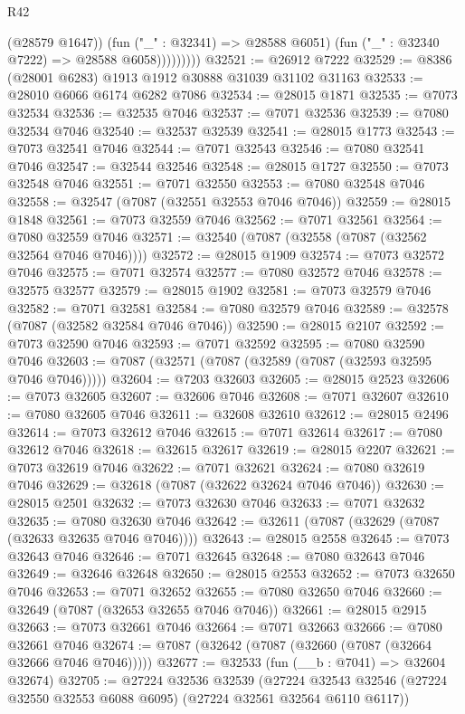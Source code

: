 \begin{lexlean}{R42}
\begin{coremodule}
{                      (@28579 @1647))
                    (fun ("_" : @32341) => @28588 @6051)
                    (fun ("_" : @32340 @7222) => @28588 @6058)))))))))
@32521 := @26912 @7222
@32529 := @8386 (@28001 @6283) @1913 @1912 @30888 @31039 @31102 @31163
@32533 := @28010 @6066 @6174 @6282 @7086
@32534 := @28015 @1871
@32535 := @7073 @32534
@32536 := @32535 @7046
@32537 := @7071 @32536
@32539 := @7080 @32534 @7046
@32540 := @32537 @32539
@32541 := @28015 @1773
@32543 := @7073 @32541 @7046
@32544 := @7071 @32543
@32546 := @7080 @32541 @7046
@32547 := @32544 @32546
@32548 := @28015 @1727
@32550 := @7073 @32548 @7046
@32551 := @7071 @32550
@32553 := @7080 @32548 @7046
@32558 := @32547 (@7087 (@32551 @32553 @7046 @7046))
@32559 := @28015 @1848
@32561 := @7073 @32559 @7046
@32562 := @7071 @32561
@32564 := @7080 @32559 @7046
@32571 := @32540 (@7087 (@32558 (@7087 (@32562 @32564 @7046 @7046))))
@32572 := @28015 @1909
@32574 := @7073 @32572 @7046
@32575 := @7071 @32574
@32577 := @7080 @32572 @7046
@32578 := @32575 @32577
@32579 := @28015 @1902
@32581 := @7073 @32579 @7046
@32582 := @7071 @32581
@32584 := @7080 @32579 @7046
@32589 := @32578 (@7087 (@32582 @32584 @7046 @7046))
@32590 := @28015 @2107
@32592 := @7073 @32590 @7046
@32593 := @7071 @32592
@32595 := @7080 @32590 @7046
@32603 := @7087 (@32571 (@7087 (@32589 (@7087 (@32593 @32595 @7046 @7046)))))
@32604 := @7203 @32603
@32605 := @28015 @2523
@32606 := @7073 @32605
@32607 := @32606 @7046
@32608 := @7071 @32607
@32610 := @7080 @32605 @7046
@32611 := @32608 @32610
@32612 := @28015 @2496
@32614 := @7073 @32612 @7046
@32615 := @7071 @32614
@32617 := @7080 @32612 @7046
@32618 := @32615 @32617
@32619 := @28015 @2207
@32621 := @7073 @32619 @7046
@32622 := @7071 @32621
@32624 := @7080 @32619 @7046
@32629 := @32618 (@7087 (@32622 @32624 @7046 @7046))
@32630 := @28015 @2501
@32632 := @7073 @32630 @7046
@32633 := @7071 @32632
@32635 := @7080 @32630 @7046
@32642 := @32611 (@7087 (@32629 (@7087 (@32633 @32635 @7046 @7046))))
@32643 := @28015 @2558
@32645 := @7073 @32643 @7046
@32646 := @7071 @32645
@32648 := @7080 @32643 @7046
@32649 := @32646 @32648
@32650 := @28015 @2553
@32652 := @7073 @32650 @7046
@32653 := @7071 @32652
@32655 := @7080 @32650 @7046
@32660 := @32649 (@7087 (@32653 @32655 @7046 @7046))
@32661 := @28015 @2915
@32663 := @7073 @32661 @7046
@32664 := @7071 @32663
@32666 := @7080 @32661 @7046
@32674 := @7087 (@32642 (@7087 (@32660 (@7087 (@32664 @32666 @7046 @7046)))))
@32677 := @32533 (fun (__b : @7041) => @32604 @32674)
@32705 := @27224
    @32536
    @32539
    (@27224 @32543 @32546 (@27224 @32550 @32553 @6088 @6095) (@27224 @32561 @32564 @6110 @6117))
}
\end{coremodule}
\end{lexlean}
